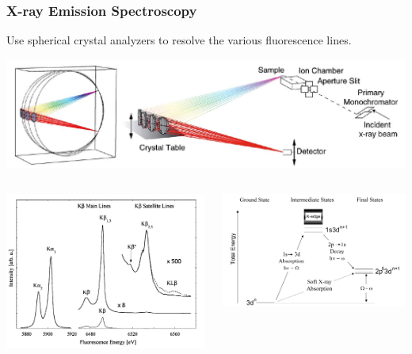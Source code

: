 \documentclass[10pt, xcolor=x11names, compress]{beamer}
\begin{document}
\begin{frame}
  \frametitle{X-ray Emission Spectroscopy}

  Use spherical crystal analyzers to resolve the various fluorescence
  lines.
  
  \begin{center}
    \includegraphics[width=0.9\linewidth]{pses/XES/exp.png}
  \end{center}
  \begin{columns}
    \begin{column}{0.4\linewidth}
      \begin{center}
        \includegraphics[width=0.9\linewidth]{pses/XES/lines.png}
      \end{center}
    \end{column}
    \begin{column}{0.6\linewidth}
      \begin{center}
        \includegraphics[width=0.8\linewidth]{pses/XES/rixs_schema.png}
      \end{center}
    \end{column}
  \end{columns}
  


\end{frame}
\end{document}
